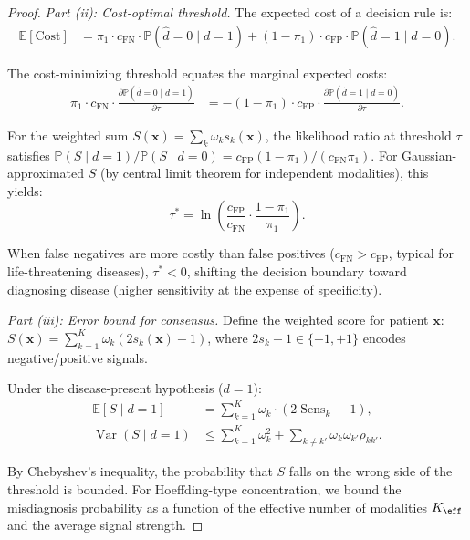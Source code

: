 \documentclass[11pt,a4paper]{article}
\theoremstyle{definition}
\DeclareMathOperator{\Var}{Var}
\DeclareMathOperator{\Sens}{Sens}
\newcommand{\E}{\mathbb{E}}
\newcommand{\Pbb}{\mathbb{P}}
\newcommand{\disease}{d}                       %
\newcommand{\diagnosis}{\hat{d}}               %
\begin{document}
\begin{proof}
\medskip\noindent\textit{Part (ii): Cost-optimal threshold.}
The expected cost of a decision rule is:
\begin{align}
    \E[\text{Cost}] &= \pi_1 \cdot c_{\text{FN}} \cdot \Pbb(\diagnosis = 0 \mid \disease = 1)
    + (1-\pi_1) \cdot c_{\text{FP}} \cdot \Pbb(\diagnosis = 1 \mid \disease = 0).
\end{align}

The cost-minimizing threshold equates the marginal expected costs:
\begin{align}
    \pi_1 \cdot c_{\text{FN}} \cdot \frac{\partial \Pbb(\diagnosis=0 \mid \disease=1)}{\partial \tau}
    &= -(1-\pi_1) \cdot c_{\text{FP}} \cdot \frac{\partial \Pbb(\diagnosis=1 \mid \disease=0)}{\partial \tau}.
\end{align}

For the weighted sum $S(\mathbf{x}) = \sum_k \omega_k s_k(\mathbf{x})$,
the likelihood ratio at threshold $\tau$ satisfies
$\Pbb(S \mid \disease=1) / \Pbb(S \mid \disease=0) = c_{\text{FP}}(1-\pi_1) / (c_{\text{FN}}\pi_1)$.
For Gaussian-approximated $S$ (by central limit theorem for independent
modalities), this yields:
\begin{equation}
    \tau^* = \ln\!\left(\frac{c_{\text{FP}}}{c_{\text{FN}}} \cdot \frac{1-\pi_1}{\pi_1}\right).
\end{equation}

When false negatives are more costly than false positives ($c_{\text{FN}} > c_{\text{FP}}$,
typical for life-threatening diseases), $\tau^* < 0$, shifting the decision
boundary toward diagnosing disease (higher sensitivity at the expense of
specificity).

\medskip\noindent\textit{Part (iii): Error bound for consensus.}
Define the weighted score for patient $\mathbf{x}$:
$S(\mathbf{x}) = \sum_{k=1}^{K} \omega_k (2s_k(\mathbf{x}) - 1)$, where
$2s_k - 1 \in \{-1, +1\}$ encodes negative/positive signals.

Under the disease-present hypothesis ($\disease = 1$):
\begin{align}
    \E[S \mid \disease = 1] &= \sum_{k=1}^{K} \omega_k \cdot (2\Sens_k - 1), \\
    \Var(S \mid \disease = 1) &\le \sum_{k=1}^{K} \omega_k^2 + \sum_{k \neq k'} \omega_k \omega_{k'} \rho_{kk'}.
\end{align}

By Chebyshev's inequality, the probability that $S$ falls on the wrong side
of the threshold is bounded. For Hoeffding-type concentration, we bound
the misdiagnosis probability as a function of the effective number of
modalities $K_{\eff}$ and the average signal strength.


\end{proof}
\end{document}
